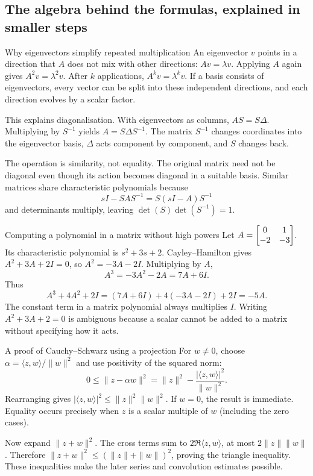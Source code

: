 \subsection{The algebra behind the formulas, explained in smaller steps}
\begin{concept}{Why eigenvectors simplify repeated multiplication}
An eigenvector $v$ points in a direction that $A$ does not mix with other directions: $Av=\lambda v$. Applying $A$ again gives $A^2v=\lambda^2v$. After $k$ applications, $A^kv=\lambda^kv$. If a basis consists of eigenvectors, every vector can be split into these independent directions, and each direction evolves by a scalar factor.

This explains diagonalisation. With eigenvectors as columns, $AS=S\Delta$. Multiplying by $S^{-1}$ yields $A=S\Delta S^{-1}$. The matrix $S^{-1}$ changes coordinates into the eigenvector basis, $\Delta$ acts component by component, and $S$ changes back.

The operation is similarity, not equality. The original matrix need not be diagonal even though its action becomes diagonal in a suitable basis. Similar matrices share characteristic polynomials because
\[sI-SAS^{-1}=S(sI-A)S^{-1}\]
and determinants multiply, leaving $\det(S)\det(S^{-1})=1$.
\end{concept}
\begin{worked}{Computing a polynomial in a matrix without high powers}
Let $A=\begin{bmatrix}0&1\\-2&-3\end{bmatrix}$. Its characteristic polynomial is $s^2+3s+2$. Cayley--Hamilton gives $A^2+3A+2I=0$, so $A^2=-3A-2I$. Multiplying by $A$,
\[A^3=-3A^2-2A=7A+6I.\]
Thus
\[A^3+4A^2+2I=(7A+6I)+4(-3A-2I)+2I=-5A.\]
The constant term in a matrix polynomial always multiplies $I$. Writing $A^2+3A+2=0$ is ambiguous because a scalar cannot be added to a matrix without specifying how it acts.
\end{worked}
\begin{concept}{A proof of Cauchy--Schwarz using a projection}
For $w\ne0$, choose $\alpha=\langle z,w\rangle/\|w\|^2$ and use positivity of the squared norm:
\[0\leq\|z-\alpha w\|^2=\|z\|^2-\frac{|\langle z,w\rangle|^2}{\|w\|^2}.\]
Rearranging gives $|\langle z,w\rangle|^2\leq\|z\|^2\|w\|^2$. If $w=0$, the result is immediate. Equality occurs precisely when $z$ is a scalar multiple of $w$ (including the zero cases).

Now expand $\|z+w\|^2$. The cross terms sum to $2\Re\langle z,w\rangle$, at most $2\|z\|\|w\|$. Therefore $\|z+w\|^2\leq(\|z\|+\|w\|)^2$, proving the triangle inequality. These inequalities make the later series and convolution estimates possible.
\end{concept}
